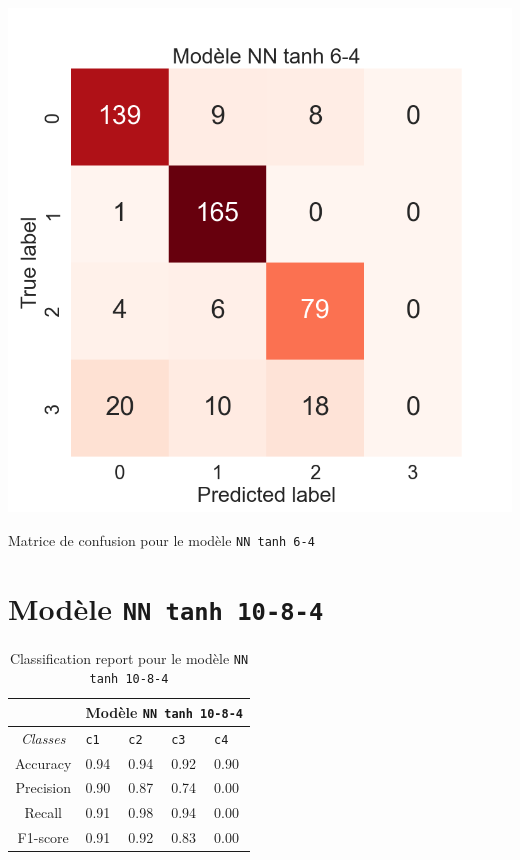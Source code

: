 \begin{table}[H]
    \includegraphics[scale=0.5]{images/y_pred_NN_tanh_6-4.png}
    \caption{\label{HomePage} Matrice de confusion pour le modèle \texttt{NN tanh 6-4}}
\end{table}

\newpage

\section{Modèle \texttt{NN tanh 10-8-4}}

\begin{table}[ht]
  \begin{tabular}{ m{5em} | m{1cm}| m{1cm} | m{1cm}| m{1cm} | } 
  \cline{2-5}
             & \multicolumn{4}{|c|}{Modèle \texttt{NN tanh 10-8-4}}\\
 \hline
 \multicolumn{1}{|c|}{\textit{Classes}} & \hfil \texttt{c1} & \hfil \texttt{c2} & \hfil \texttt{c3} & \hfil \texttt{c4} \\ 
  \hline
  \multicolumn{1}{|c|}{Accuracy} & \hfil 0.94 & \hfil 0.94 & \hfil 0.92 & \hfil 0.90 \\ 
  \hline
  \multicolumn{1}{|c|}{Precision} & \hfil 0.90 & \hfil 0.87 & \hfil 0.74 & \hfil 0.00 \\ 
  \hline
  \multicolumn{1}{|c|}{Recall} & \hfil 0.91 & \hfil 0.98 & \hfil 0.94 & \hfil 0.00 \\ 
  \hline
  \multicolumn{1}{|c|}{F1-score} & \hfil 0.91 & \hfil 0.92 & \hfil 0.83 & \hfil 0.00 \\ 
  \hline
\end{tabular}
\caption{Classification report pour le modèle \texttt{NN tanh 10-8-4}}
  \label{Tab:Tcr}
\end{table}

